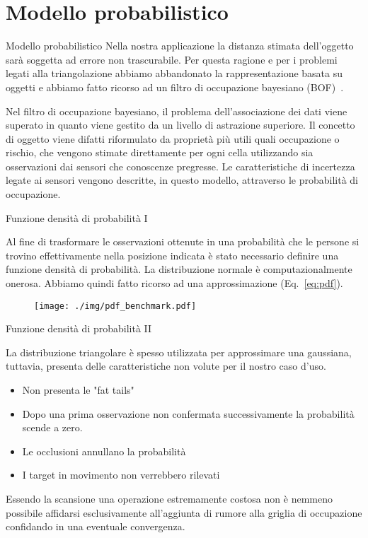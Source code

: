\documentclass[10pt]{beamer}
\begin{document}
	\section{Modello probabilistico}\label{sec:Modello-probabilistico}
	\frame{\sectionpage}
	\begin{frame}{Modello probabilistico}
	Nella nostra applicazione la distanza stimata
	dell'oggetto sarà soggetta ad errore non trascurabile. Per questa
	ragione e per i problemi legati alla triangolazione abbiamo abbandonato la
	rappresentazione basata su oggetti e abbiamo fatto ricorso ad un filtro di
	occupazione bayesiano (BOF)~\cite{tay2008bayesian}.
	
	Nel filtro di occupazione bayesiano, il problema dell'associazione dei dati viene superato in quanto
	viene gestito da un livello di astrazione superiore. Il concetto di oggetto
	viene difatti riformulato da proprietà più utili quali occupazione o
	rischio, che vengono stimate direttamente per ogni cella utilizzando sia
	osservazioni dai sensori che conoscenze pregresse. Le caratteristiche di
	incertezza legate ai sensori vengono descritte, in questo modello,
	attraverso le probabilità di occupazione.
	\end{frame}
	\begin{frame}{Funzione densità di probabilità I}
	
	Al fine di trasformare le osservazioni ottenute in una probabilità che le
	persone si trovino effettivamente nella posizione indicata è stato
	necessario definire una funzione densità di probabilità. La distribuzione
	normale è computazionalmente onerosa. Abbiamo quindi fatto ricorso ad una approssimazione (Eq.~\ref{eq:pdf}).
	
	
	
	\begin{figure}[ht]
		\centering
		\texttt{[image: ./img/pdf\_benchmark.pdf]}
		\label{fig:pdf_benchmark}
	\end{figure}
	
	\end{frame}
	\begin{frame}{Funzione densità di probabilità II}
	
	La distribuzione triangolare è spesso utilizzata per approssimare una
	gaussiana, tuttavia, presenta delle caratteristiche non volute per il
	nostro caso d'uso. 
	
	\begin{itemize}
		\pause\item Non presenta le "fat tails"
		\pause\item Dopo una prima osservazione non confermata successivamente la probabilità scende a zero.
		\pause\item Le occlusioni annullano la probabilità
		\pause\item I target in movimento non verrebbero rilevati
	\end{itemize}
	
	\pause Essendo la scansione una operazione estremamente costosa non è nemmeno
	possibile affidarsi esclusivamente all'aggiunta di rumore alla griglia di
	occupazione confidando in una eventuale convergenza.

	\end{frame}
\end{document}
